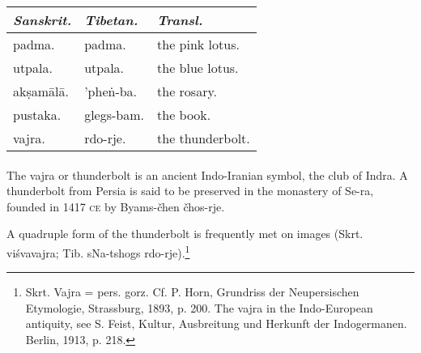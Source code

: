 \documentclass[a4paper, 12pt, oneside]{article}
\begin{document}
\begin{table}[H]
    \centering
    \small
    \begin{tabular}{l l l}
   
        \emph{Sanskrit.}  &  \emph{Tibetan.}    &  \emph{Transl.}           \\ \hline
         padma.     &  padma.      &  the pink lotus.   \\
         utpala.    &  utpala.     &  the blue lotus.   \\
         ak\d{s}am\={a}l\={a}.  &  'phe\.{n}-ba.   &  the rosary.       \\
         pustaka.   &  glegs-bam.  &  the book.         \\
         vajra.     &  rdo-rje.    &  the thunderbolt. \\
    \end{tabular}
\end{table}
\paragraph{}
The vajra or thunderbolt is an ancient Indo-Iranian symbol, the club of Indra. A thunderbolt from Persia is said to be preserved in the monastery of Se-ra, founded in 1417 \textsc{ce} by Byams-čhen čhos-rje.

A quadruple form of the thunderbolt is frequently met on images (Skrt. vi\'{s}vavajra; Tib. sNa-tshogs rdo-rje).\footnote{Skrt. Vajra = pers. gorz. Cf. P. Horn, Grundriss der Neupersischen Etymologie, Strassburg, 1893, p. 200. The vajra in the Indo-European antiquity, see S. Feist, Kultur, Ausbreitung und Herkunft der Indogermanen. Berlin, 1913, p. 218.}
\end{document}
